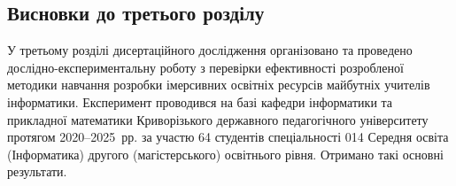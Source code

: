 \subsection*{Висновки до третього розділу}

У третьому розділі дисертаційного дослідження організовано та проведено дослідно-експериментальну роботу з перевірки ефективності розробленої методики навчання розробки імерсивних освітніх ресурсів майбутніх учителів інформатики. Експеримент проводився на базі кафедри інформатики та прикладної математики Криворізького державного педагогічного університету протягом 2020--2025~рр. за участю 64 студентів спеціальності 014 Середня освіта (Інформатика) другого (магістерського) освітнього рівня. Отримано такі основні результати.

